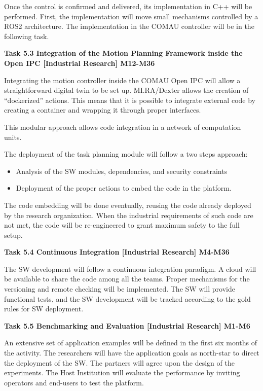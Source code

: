 \begin{planactivitybody}
Once the control is confirmed and delivered, its implementation in C++
will be performed. First, the implementation will move small mechanisms
controlled by a ROS2 architecture. The implementation in the COMAU
controller will be in the following task.

\plantaskskip
\textbf{Task 5.3 Integration of the Motion Planning Framework inside the
Open IPC {[}Industrial Research{]} M12-M36}

Integrating the motion controller inside the COMAU Open IPC will allow a
straightforward digital twin to be set up. MI.RA/Dexter allows the
creation of ``dockerized'' actions. This means that it is possible to
integrate external code by creating a container and wrapping it through
proper interfaces.

This modular approach allows code integration in a network of
computation units.

The deployment of the task planning module will follow a two steps
approach:

\begin{itemize}
\item
  Analysis of the SW modules, dependencies, and security constraints
\item
  Deployment of the proper actions to embed the code in the platform.
\end{itemize}

The code embedding will be done eventually, reusing the code already
deployed by the research organization. When the industrial requirements
of such code are not met, the code will be re-engineered to grant
maximum safety to the full setup.

\plantaskskip
\textbf{Task 5.4 Continuous Integration {[}Industrial Research{]}
M4-M36}

The SW development will follow a continuous integration paradigm. A
cloud will be available to share the code among all the teams. Proper
mechanisms for the versioning and remote checking will be implemented.
The SW will provide functional tests, and the SW development will be
tracked according to the gold rules for SW deployment.

\plantaskskip
\textbf{Task 5.5 Benchmarking and Evaluation {[}Industrial Research{]}
M1-M6}

An extensive set of application examples will be defined in the first
six months of the activity. The researchers will have the application
goals as north-star to direct the deployment of the SW. The partners
will agree upon the design of the experiments. The Host Institution will
evaluate the performance by inviting operators and end-users to test the
platform.
\end{planactivitybody}

